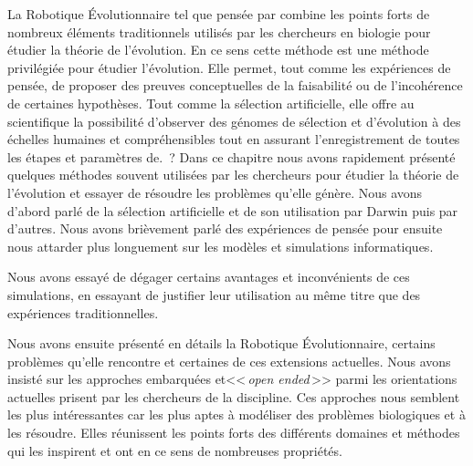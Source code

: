 La Robotique \'Evolutionnaire tel que pensée par \cite{bredeche2012environmentdrivenopenende} combine les points forts de nombreux éléments traditionnels utilisés par les chercheurs en biologie pour étudier la théorie de l'évolution. En ce sens cette méthode est une méthode privilégiée pour étudier l'évolution. Elle permet, tout comme les expériences de pensée, de proposer des preuves conceptuelles de la faisabilité ou de l'incohérence de certaines hypothèses. Tout comme la sélection artificielle, elle offre au scientifique la possibilité d'observer des génomes de sélection et d'évolution à des échelles humaines et compréhensibles tout en assurant l'enregistrement de toutes les étapes et paramètres de. ?
Dans ce chapitre nous avons rapidement présenté quelques méthodes souvent utilisées par les chercheurs pour étudier la théorie de l'évolution et essayer de résoudre les problèmes qu'elle génère. Nous avons d'abord parlé de la sélection artificielle et de son utilisation par Darwin puis par d'autres. Nous avons brièvement parlé des expériences de pensée pour ensuite nous attarder plus longuement sur les modèles et simulations informatiques.

Nous avons essayé de dégager certains avantages et inconvénients de ces simulations, en essayant de justifier leur utilisation au même titre que des expériences traditionnelles.

Nous avons ensuite présenté en détails la Robotique \'Evolutionnaire, certains problèmes qu'elle rencontre et certaines de ces extensions actuelles. Nous avons insisté sur les approches embarquées et<<\,\emph{open ended}\,>> parmi les orientations actuelles prisent par les chercheurs de la discipline. Ces approches nous semblent les plus intéressantes car les plus aptes à modéliser des problèmes biologiques et à les résoudre. Elles réunissent les points forts des différents domaines et méthodes qui les inspirent et ont en ce sens de nombreuses propriétés.

